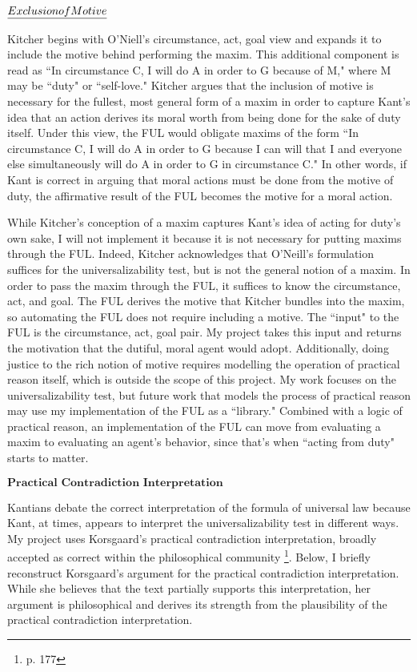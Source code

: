 \begin{isabellebody}
\begin{isamarkuptext}
$\emph{Exclusion of Motive}$

Kitcher \cite{whatisamaxim} begins with O'Niell's circumstance, act, goal view and expands it to include the motive 
behind performing the maxim. This additional component is read 
as ``In circumstance C, I will do A in order to G because of M," where M may be ``duty" or ``self-love."
Kitcher argues that the inclusion of motive is necessary for the fullest, most general form of a maxim
in order to capture Kant's idea that an action derives its moral worth from being done for the sake of duty itself.
Under this view, the FUL would obligate maxims of the form 
``In circumstance C, I will do A in order to G because I can will that I and everyone else simultaneously
will do A in order to G in circumstance C." In other words, if Kant is correct in arguing that moral 
actions must be done from the motive of duty, the affirmative result of the FUL becomes 
the motive for a moral action.

While Kitcher's conception of a maxim captures Kant's idea of acting for duty's own sake, I will not implement it 
because it is not necessary for putting maxims through the FUL. Indeed, Kitcher acknowledges that 
O'Neill's formulation suffices for the universalizability test, but is not the general notion of a maxim.
In order to pass the maxim through the FUL, it suffices to know the circumstance, act, and goal. The FUL
derives the motive that Kitcher bundles into the maxim, so automating the FUL does not require 
including a motive. The ``input" to the FUL is the circumstance, act, goal pair. My project takes 
this input and returns the motivation that the dutiful, moral agent would adopt. Additionally, doing
justice to the rich notion of motive requires modelling the operation of practical reason itself, 
which is outside the scope of this project. My work focuses on the universalizability test, but future work that 
models the process of practical reason may use my implementation of the FUL as a ``library." Combined 
with a logic of practical reason, an implementation of the FUL can move from evaluating a maxim to 
evaluating an agent's behavior, since that's when ``acting from duty" starts to matter.

$\textbf{Practical Contradiction Interpretation}$

Kantians debate the correct interpretation of the formula of universal law because Kant, 
at times, appears to interpret the universalizability test in different ways. My project uses Korsgaard's practical contradiction 
interpretation, broadly accepted as correct within the philosophical community \cite{ebelsduggan}\footnote{p. 177}.
Below, I briefly reconstruct Korsgaard's argument for the practical contradiction interpretation. While 
she believes that the text partially supports this interpretation, her argument is philosophical and 
derives its strength from the plausibility of the practical contradiction interpretation.


\end{isamarkuptext}
\end{isabellebody}
